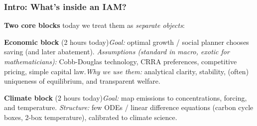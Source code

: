 \documentclass[xcolor=x11names,compress,aspectratio=169]{beamer}%
\makeatletter
\renewenvironment{itemize}{\begin{compactitemize}[<+-| alert@+>]}{\end{compactitemize}}
\makeatother
\begin{document}
\begin{frame}%
%

\frametitle{Intro: What's inside an IAM?}%


\begin{itemize}
\item \textbf{Two core blocks} today we treat them as \emph{separate
objects}:\vspace{1ex} \vspace{0.4em}

\begin{itemize}
\item \textbf{Economic block} (2 hours today)\vspace{1ex}\newline\emph{Goal:}
optimal growth / social planner chooses saving (and later abatement).\newline%
\emph{Assumptions (standard in macro, exotic for mathematicians):}
Cobb-Douglas technology, CRRA preferences, competitive pricing, simple capital
law.\vspace{1ex}\newline\emph{Why we use them:} analytical clarity, stability,
(often) uniqueness of equilibrium, and transparent welfare. \vspace{0.6em}

\item \textbf{Climate block} (2 hours today)\vspace{1ex}\newline\emph{Goal:}
map emissions to concentrations, forcing, and temperature.\vspace{1ex}%
\newline\emph{Structure:} few ODEs / linear difference equations (carbon cycle
boxes, 2-box temperature), calibrated to climate science.
\end{itemize}
\end{itemize}

%

\transboxout
\end{frame}%
%
\end{document}
